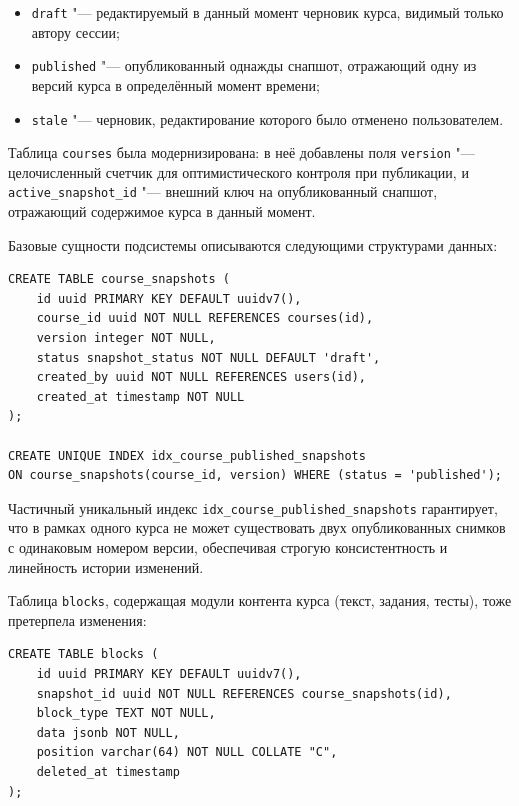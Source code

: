 \documentclass[coursework]{SCWorks}
\begin{document}
\begin{itemize}
  \item \texttt{draft} "--- редактируемый в данный момент черновик курса, видимый только автору сессии;
  \item \texttt{published} "--- опубликованный однажды снапшот, отражающий одну из версий курса в определённый момент времени;
  \item \texttt{stale} "--- черновик, редактирование которого было отменено пользователем.
\end{itemize}

Таблица \texttt{courses} была модернизирована: в неё добавлены поля \texttt{version} "--- целочисленный счетчик для оптимистического контроля при публикации, и \texttt{active\_snapshot\_id} "--- внешний ключ на опубликованный снапшот, отражающий содержимое курса в данный момент.

Базовые сущности подсистемы описываются следующими структурами данных:

\begin{verbatim}
CREATE TABLE course_snapshots (
    id uuid PRIMARY KEY DEFAULT uuidv7(),
    course_id uuid NOT NULL REFERENCES courses(id),
    version integer NOT NULL,
    status snapshot_status NOT NULL DEFAULT 'draft',
    created_by uuid NOT NULL REFERENCES users(id),
    created_at timestamp NOT NULL
);

CREATE UNIQUE INDEX idx_course_published_snapshots
ON course_snapshots(course_id, version) WHERE (status = 'published');
\end{verbatim}

Частичный уникальный индекс \texttt{idx\_course\_published\_snapshots} гарантирует, что в рамках одного курса не может существовать двух опубликованных снимков с одинаковым номером версии, обеспечивая строгую консистентность и линейность истории изменений.

Таблица \texttt{blocks}, содержащая модули контента курса (текст, задания, тесты), тоже претерпела изменения:

\begin{verbatim}
CREATE TABLE blocks (
    id uuid PRIMARY KEY DEFAULT uuidv7(),
    snapshot_id uuid NOT NULL REFERENCES course_snapshots(id),
    block_type TEXT NOT NULL,
    data jsonb NOT NULL,
    position varchar(64) NOT NULL COLLATE "C",
    deleted_at timestamp
);
\end{verbatim}
\end{document}
